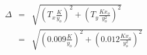 

\[
\begin{array}{lcl} \Delta & = & \sqrt{(T_{x}\frac{K}{y_o})^2 + (T_{y}\frac{Kx_{o}}{y_{o}^2})^2} \\ & = & \sqrt{(0.009\frac{K}{y_o})^2 + (0.012\frac{Kx_{o}}{y_{o}^2})^2} \end{array}
\]


